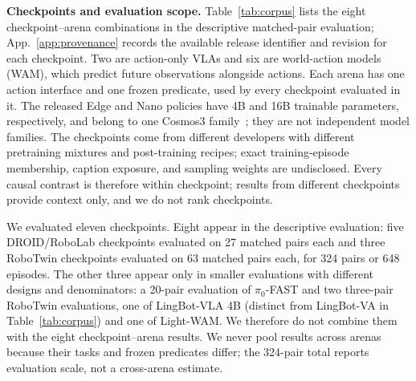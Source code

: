 \documentclass[letterpaper,10pt,conference]{ieeeconf}%
\newcommand{\tightparagraph}[1]{\vspace{0.25em}\noindent\textbf{#1}}
\begin{document}
\tightparagraph{Checkpoints and evaluation scope.}
Table~\ref{tab:corpus} lists the eight checkpoint--arena combinations in the descriptive matched-pair evaluation; App.~\ref{app:provenance} records the available release identifier and revision for each checkpoint.
Two are action-only VLAs and six are world-action models (WAM), which predict future observations alongside actions.
Each arena has one action interface and one frozen predicate, used by every checkpoint evaluated in it.
The released Edge and Nano policies have 4B and 16B trainable parameters, respectively, and belong to one Cosmos3 family~\cite{nvidia2026cosmos3}; they are not independent model families.
The checkpoints come from different developers with different pretraining mixtures and post-training recipes; exact training-episode membership, caption exposure, and sampling weights are undisclosed.
Every causal contrast is therefore within checkpoint; results from different checkpoints provide context only, and we do not rank checkpoints.

We evaluated eleven checkpoints.
Eight appear in the descriptive evaluation: five DROID/RoboLab checkpoints evaluated on 27 matched pairs each and three RoboTwin checkpoints evaluated on 63 matched pairs each, for 324 pairs or 648 episodes.
The other three appear only in smaller evaluations with different designs and denominators: a 20-pair evaluation of $\pi_0$-FAST and two three-pair RoboTwin evaluations, one of LingBot-VLA 4B (distinct from LingBot-VA in Table~\ref{tab:corpus}) and one of Light-WAM.
We therefore do not combine them with the eight checkpoint--arena results.
We never pool results across arenas because their tasks and frozen predicates differ; the 324-pair total reports evaluation scale, not a cross-arena estimate.
\end{document}
